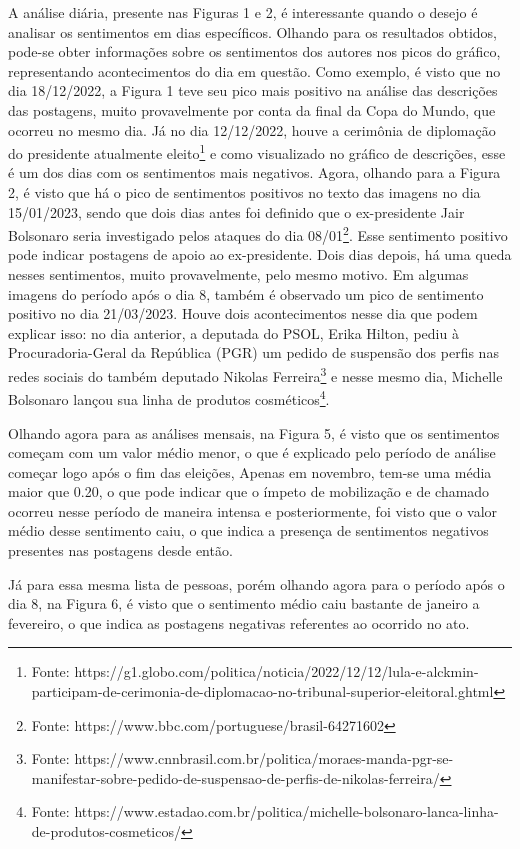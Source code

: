 \documentclass[manuscript,screen,review]{acmart}
\begin{document}
A análise diária, presente nas Figuras 1 e 2, é interessante quando o desejo é analisar os sentimentos em dias específicos. Olhando para os resultados obtidos, pode-se obter informações sobre os sentimentos dos autores nos picos do gráfico, representando acontecimentos do dia em questão. Como exemplo, é visto que no dia 18/12/2022, a Figura 1 teve seu pico mais positivo na análise das descrições das postagens, muito provavelmente por conta da final da Copa do Mundo, que ocorreu no mesmo dia. Já no dia 12/12/2022, houve a cerimônia de diplomação do presidente atualmente eleito\footnote{Fonte: https://g1.globo.com/politica/noticia/2022/12/12/lula-e-alckmin-participam-de-cerimonia-de-diplomacao-no-tribunal-superior-eleitoral.ghtml} e como visualizado no gráfico de descrições, esse é um dos dias com os sentimentos mais negativos. Agora, olhando para a Figura 2, é visto que há o pico de sentimentos positivos no texto das imagens no dia 15/01/2023, sendo que dois dias antes foi definido que o ex-presidente Jair Bolsonaro seria investigado pelos ataques do dia 08/01\footnote{Fonte: https://www.bbc.com/portuguese/brasil-64271602}. Esse sentimento positivo pode indicar postagens de apoio ao ex-presidente. Dois dias depois, há uma queda nesses sentimentos, muito provavelmente, pelo mesmo motivo. Em algumas imagens do período após o dia 8, também é observado um pico de sentimento positivo no dia 21/03/2023. Houve dois acontecimentos nesse dia que podem explicar isso: no dia anterior, a deputada do PSOL, Erika Hilton, pediu à Procuradoria-Geral da República (PGR) um pedido de suspensão dos perfis nas redes sociais do também deputado Nikolas Ferreira\footnote{Fonte: https://www.cnnbrasil.com.br/politica/moraes-manda-pgr-se-manifestar-sobre-pedido-de-suspensao-de-perfis-de-nikolas-ferreira/} e nesse mesmo dia, Michelle Bolsonaro lançou sua linha de produtos cosméticos\footnote{Fonte: https://www.estadao.com.br/politica/michelle-bolsonaro-lanca-linha-de-produtos-cosmeticos/}.

Olhando agora para as análises mensais, na Figura 5, é visto que os sentimentos começam com um valor médio menor, o que é explicado pelo período de análise começar logo após o fim das eleições, Apenas em novembro, tem-se uma média maior que 0.20, o que pode indicar que o ímpeto de mobilização e de chamado ocorreu nesse período de maneira intensa e posteriormente, foi visto que o valor médio desse sentimento caiu, o que indica a presença de sentimentos negativos presentes nas postagens desde então.

Já para essa mesma lista de pessoas, porém olhando agora para o período após o dia 8, na Figura 6, é visto que o sentimento médio caiu bastante de janeiro a fevereiro, o que indica as postagens negativas referentes ao ocorrido no ato.
\end{document}

